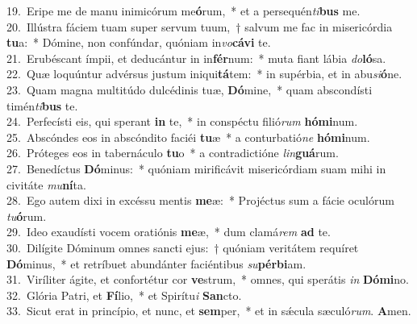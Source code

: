 {19.~}Eripe me de manu inimicórum me\textbf{ó}rum,~* et a persequén\textit{ti}\textbf{bus} me.\\
{20.~}Illústra fáciem tuam super servum tuum,~† salvum me fac in misericórdia \textbf{tu}a:~* Dómine, non confúndar, quóniam in\textit{vo}\textbf{cá}\textbf{vi} te.\\
{21.~}Erubéscant ímpii, et deducántur in in\textbf{fér}num:~* muta fiant lábia \textit{do}\textbf{ló}sa.\\
{22.~}Quæ loquúntur advérsus justum iniqui\textbf{tá}tem:~* in supérbia, et in abu\textit{si}\textbf{ó}ne.\\
{23.~}Quam magna multitúdo dulcédinis tuæ, \textbf{Dó}mine,~* quam abscondísti timén\textit{ti}\textbf{bus} te.\\
{24.~}Perfecísti eis, qui sperant \textbf{in} te,~* in conspéctu filió\textit{rum} \textbf{hó}\textbf{mi}num.\\
{25.~}Abscóndes eos in abscóndito faciéi \textbf{tu}æ~* a conturbatió\textit{ne} \textbf{hó}\textbf{mi}num.\\
{26.~}Próteges eos in tabernáculo \textbf{tu}o~* a contradictióne \textit{lin}\textbf{guá}rum.\\
{27.~}Benedíctus \textbf{Dó}minus:~* quóniam mirificávit misericórdiam suam mihi in civitáte \textit{mu}\textbf{ní}ta.\\
{28.~}Ego autem dixi in excéssu mentis \textbf{me}æ:~* Projéctus sum a fácie oculórum \textit{tu}\textbf{ó}rum.\\
{29.~}Ideo exaudísti vocem oratiónis \textbf{me}æ,~* dum clamá\textit{rem} \textbf{ad} te.\\
{30.~}Dilígite Dóminum omnes sancti ejus:~† quóniam veritátem requíret \textbf{Dó}minus,~* et retríbuet abundánter faciéntibus \textit{su}\textbf{pér}\textbf{bi}am.\\
{31.~}Viríliter ágite, et confortétur cor \textbf{ve}strum,~* omnes, qui sperátis \textit{in} \textbf{Dó}\textbf{mi}no.\\
{32.~}Glória Patri, et \textbf{Fí}lio,~* et Spirítu\textit{i} \textbf{San}cto.\\
{33.~}Sicut erat in princípio, et nunc, et \textbf{sem}per,~* et in sǽcula sæculó\textit{rum}. \textbf{A}men.\\
